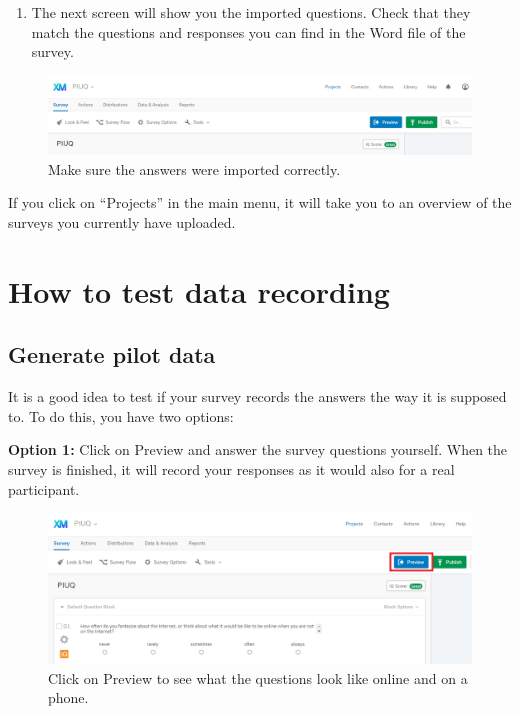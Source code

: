 \documentclass[
]{book}
\providecommand{\tightlist}{%
  \setlength{\itemsep}{0pt}\setlength{\parskip}{0pt}}
\begin{document}
\begin{enumerate}
\def\labelenumi{\arabic{enumi}.}
\setcounter{enumi}{5}
\tightlist
\item
  The next screen will show you the imported questions. Check that they match the questions and responses you can find in the Word file of the survey.
\end{enumerate}

\begin{figure}

{\centering \includegraphics[width=0.85\linewidth]{images/Qualtrics/07Done} 

}

\caption{Make sure the answers were imported correctly.}\label{fig:Figure11-6}
\end{figure}

If you click on ``Projects'' in the main menu, it will take you to an overview of the surveys you currently have uploaded.

\hypertarget{how-to-test-data-recording}{%
\section{How to test data recording}\label{how-to-test-data-recording}}

\hypertarget{generate-pilot-data}{%
\subsection{Generate pilot data}\label{generate-pilot-data}}

It is a good idea to test if your survey records the answers the way it is supposed to. To do this, you have two options:

\textbf{Option 1:} Click on Preview and answer the survey questions yourself. When the survey is finished, it will record your responses as it would also for a real participant.

\begin{figure}

{\centering \includegraphics[width=0.85\linewidth]{images/Qualtrics/08Preview} 

}

\caption{Click on Preview to see what the questions look like online and on a phone.}\label{fig:Figure11-7}
\end{figure}
\end{document}
